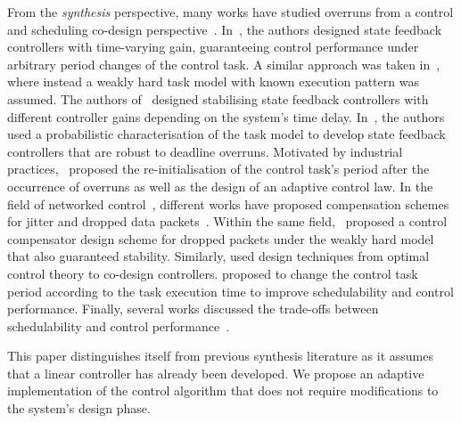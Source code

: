 From the \emph{synthesis} perspective, many works have studied overruns from a control and scheduling co-design perspective~\cite{Arzen:2000}. 
In~\cite{Schinkel:2006}, the authors designed state feedback controllers with time-varying gain, guaranteeing control performance under arbitrary period changes of the control task.
A similar approach was taken in~\cite{Ramanathan:1997}, where instead a weakly hard task model with known execution pattern was assumed.
The authors of~\cite{Chakraborty:2012} designed stabilising state feedback controllers with different controller gains depending on the system's time delay.
In~\cite{Pazzaglia:2019}, the authors used a probabilistic characterisation of the task model to develop state feedback controllers that are robust to deadline overruns.
Motivated by industrial practices,~\cite{Pazzaglia:2021} proposed the re-initialisation of the control task's period after the occurrence of overruns as well as the design of an adaptive control law.
In the field of networked control~\cite{Gupta:2010,Torngren:1998}, different works have proposed compensation schemes for jitter and dropped data packets~\cite{Nilsson:1998,Zhang:2001,Hespanha:2007}.
Within the same field,~\cite{Chakraborty:2014} proposed a control compensator design scheme for dropped packets under the weakly hard model that also guaranteed stability.
Similarly, \cite{Linsenmayer:2021} used design techniques from optimal control theory to co-design controllers.
\cite{Caccamo:2000} proposed to change the control task period according to the task execution time to improve schedulability and control performance.
Finally, several works discussed the trade-offs between schedulability and control performance~\cite{Crespo:1999,Eker:1999,Marti:2001,Caccamo:2002}.

This paper distinguishes itself from previous synthesis literature as it assumes that a linear controller has already been developed.
We propose an adaptive implementation of the control algorithm that does not require modifications to the system's design phase.


